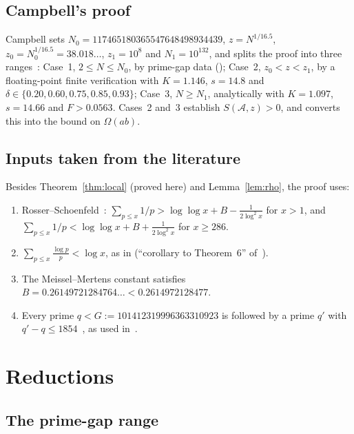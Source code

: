 \documentclass[preprint,11pt]{elsarticle}
\theoremstyle{definition}
\theoremstyle{remark}
\newcommand{\cA}{\mathcal{A}}
\numberwithin{equation}{section}
\begin{document}
\subsection{Campbell's proof}
Campbell sets $N_0=117465180365547648498934439$, $z=N^{1/16.5}$,
$z_0=N_0^{1/16.5}=38.018\ldots$, $z_1=10^8$ and $N_1=10^{132}$, and splits
the proof into three ranges~\cite[\S\S4--5]{Campbell2026}: Case~1,
$2\le N\le N_0$, by prime-gap data (\cite[Lemma~5.1]{Campbell2026}); Case~2,
$z_0<z<z_1$, by a floating-point finite verification with $K=1.146$,
$s=14.8$ and $\delta\in\{0.20,0.60,0.75,0.85,0.93\}$; Case~3, $N\ge N_1$,
analytically with $K=1.097$, $s=14.66$ and $F>0.0563$. Cases~2 and~3
establish $S(\cA,z)>0$, and \cite[Lemma~5.2]{Campbell2026} converts this
into the bound on $\Omega(ab)$.

\subsection{Inputs taken from the literature}\label{subsec:inherited}
Besides Theorem~\ref{thm:local} (proved here) and Lemma~\ref{lem:rho}, the proof uses:
\begin{enumerate}
\item[(H3)] Rosser--Schoenfeld~\cite[Theorem~5]{RS1962}:
  $\sum_{p\le x}1/p>\log\log x+B-\frac{1}{2\log^2x}$ for $x>1$, and
  $\sum_{p\le x}1/p<\log\log x+B+\frac{1}{2\log^2x}$ for $x\ge286$.
\item[(H4)] $\sum_{p\le x}\frac{\log p}{p}<\log x$, as in
  \cite[\S4]{Campbell2026} (``corollary to Theorem~6'' of~\cite{RS1962}).
\item[(H5)] The Meissel--Mertens constant satisfies
  $B=0.26149721284764\ldots<0.2614972128477$.
\item[(H7)] Every prime $q<G:=101412319996363310923$ is followed by a prime
  $q'$ with $q'-q\le1854$~\cite{CaldwellGaps}, as used
  in~\cite[\S5]{Campbell2026}.
\end{enumerate}

\section{Reductions}\label{sec:reductions}

\subsection{The prime-gap range}
\end{document}
